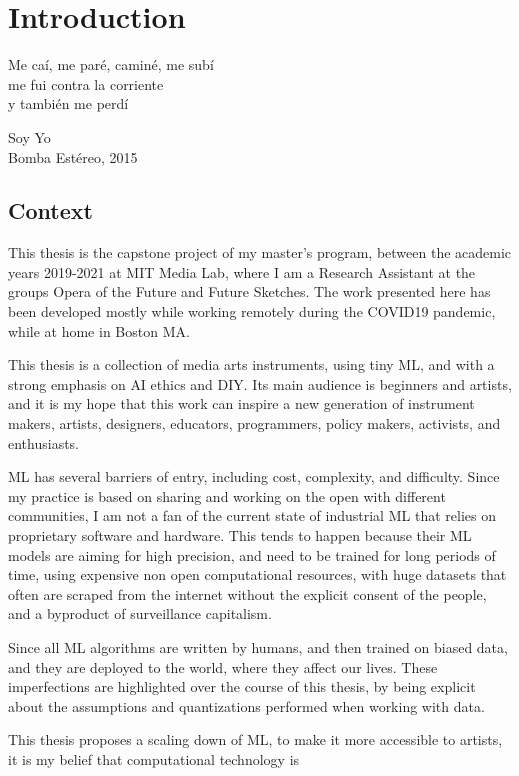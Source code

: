 \chapter{Introduction}

\epigraph{Me caí, me paré, caminé, me subí \\ me fui contra la corriente \\ y también me perdí}{Soy Yo \\ Bomba Estéreo, 2015}

\section{Context}

This thesis is the capstone project of my master's program, between the academic years 2019-2021 at MIT Media Lab, where I am a Research Assistant at the groups Opera of the Future and Future Sketches. The work presented here has been developed mostly while working remotely during the COVID19 pandemic, while at home in Boston MA.

This thesis is a collection of media arts instruments, using tiny \acrshort{ML}, and with a strong emphasis on \acrlong{AI} ethics and \acrlong{DIY}. Its main audience is beginners and artists, and it is my hope that this work can inspire a new generation of instrument makers, artists, designers, educators, programmers, policy makers, activists, and enthusiasts.

\acrfull{ML} has several barriers of entry, including cost, complexity, and difficulty. Since my practice is based on sharing and working on the open with different communities, I am not a fan of the current state of industrial \acrshort{ML} that relies on proprietary software and hardware. This tends to happen because their ML models are aiming for high precision, and need to be trained for long periods of time, using expensive non open computational resources, with huge datasets that often are scraped from the internet without the explicit consent of the people, and a byproduct of surveillance capitalism.

Since all \acrshort{ML} algorithms are written by humans, and then trained on biased data, and they are deployed to the world, where they affect our lives. These imperfections are highlighted over the course of this thesis, by being explicit about the assumptions and quantizations performed when working with data.



This thesis proposes a scaling down of \acrshort{ML}, to make it more accessible to artists, it is my belief that computational technology is 

